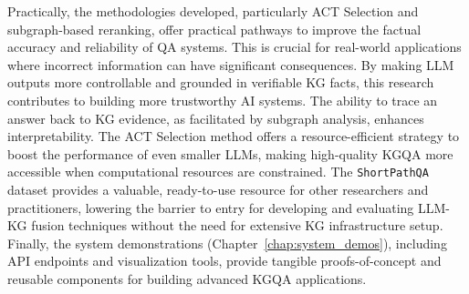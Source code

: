 Practically, the methodologies developed, particularly ACT Selection and subgraph-based reranking, offer practical pathways to improve the factual accuracy and reliability of QA systems. This is crucial for real-world applications where incorrect information can have significant consequences. By making LLM outputs more controllable and grounded in verifiable KG facts, this research contributes to building more trustworthy AI systems. The ability to trace an answer back to KG evidence, as facilitated by subgraph analysis, enhances interpretability. The ACT Selection method offers a resource-efficient strategy to boost the performance of even smaller LLMs, making high-quality KGQA more accessible when computational resources are constrained. The \texttt{ShortPathQA} dataset provides a valuable, ready-to-use resource for other researchers and practitioners, lowering the barrier to entry for developing and evaluating LLM-KG fusion techniques without the need for extensive KG infrastructure setup. Finally, the system demonstrations (Chapter~\ref{chap:system_demos}), including API endpoints and visualization tools, provide tangible proofs-of-concept and reusable components for building advanced KGQA applications.

